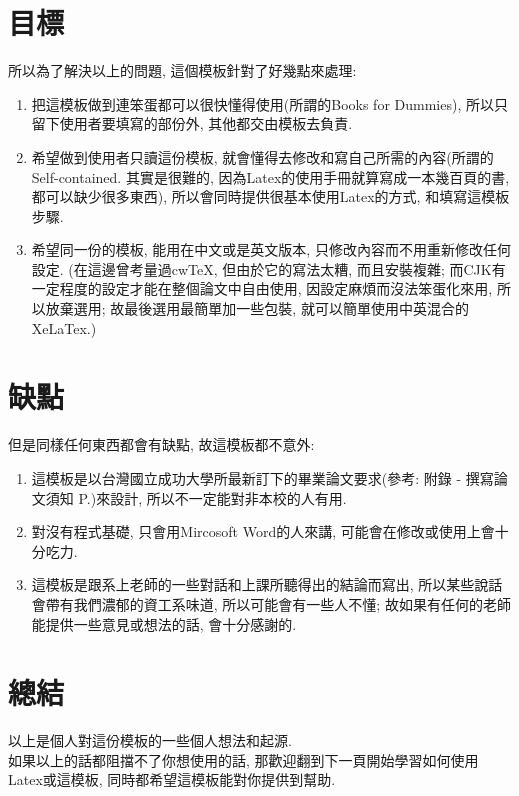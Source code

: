 \section{目標}
所以為了解決以上的問題, 這個模板針對了好幾點來處理:

\begin{enumerate}

    \item 把這模板做到連笨蛋都可以很快懂得使用(所謂的Books for Dummies), 所以只留下使用者要填寫的部份外, 其他都交由模板去負責.

    \item 希望做到使用者只讀這份模板, 就會懂得去修改和寫自己所需的內容(所謂的Self-contained. 其實是很難的, 因為Latex的使用手冊就算寫成一本幾百頁的書, 都可以缺少很多東西), 所以會同時提供很基本使用Latex的方式, 和填寫這模板步驟.

    \item 希望同一份的模板, 能用在中文或是英文版本, 只修改內容而不用重新修改任何設定. (在這邊曾考量過cwTeX, 但由於它的寫法太糟, 而且安裝複雜\cite{web:latex:cwtex}; 而CJK有一定程度的設定才能在整個論文中自由使用, 因設定麻煩而沒法笨蛋化來用, 所以放棄選用; 故最後選用最簡單加一些包裝, 就可以簡單使用中英混合的XeLaTex.)

\end{enumerate}

\section{缺點}
但是同樣任何東西都會有缺點, 故這模板都不意外:

\begin{enumerate}

    \item 這模板是以台灣國立成功大學所最新訂下的畢業論文要求(參考: 附錄 - 撰寫論文須知 P.\pageref{appendix:thesis-spec})來設計, 所以不一定能對非本校的人有用.

    \item 對沒有程式基礎, 只會用Mircosoft Word的人來講, 可能會在修改或使用上會十分吃力.

    \item 這模板是跟系上老師的一些對話和上課所聽得出的結論而寫出, 所以某些說話會帶有我們濃郁的資工系味道, 所以可能會有一些人不懂; 故如果有任何的老師能提供一些意見或想法的話, 會十分感謝的.

\end{enumerate}

\section{總結}

以上是個人對這份模板的一些個人想法和起源.\\

如果以上的話都阻擋不了你想使用的話, 那歡迎翻到下一頁開始學習如何使用Latex或這模板, 同時都希望這模板能對你提供到幫助.

\clearpage


